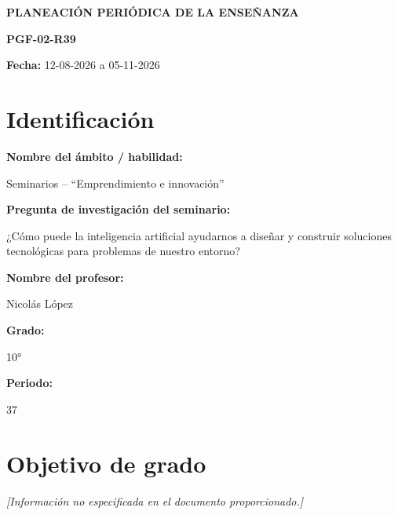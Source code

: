\documentclass[12pt,a4paper]{article}
\newcommand{\placeholder}[1]{
	\textit{\textcolor{secondary}{[#1]}}
}
\begin{document}
	
	
	\begin{center}
		
		{\Large\bfseries\color{primary}
			PLANEACIÓN PERIÓDICA DE LA ENSEÑANZA}
		
		\vspace{0.4cm}
		
		{\normalsize\bfseries PGF-02-R39}
		
		\vspace{0.3cm}
		
		{\normalsize
			\textbf{Fecha:} 12-08-2026 a 05-11-2026}
		
	\end{center}
	
	\vspace{0.8cm}
	
	
	\section{Identificación}
	
	\textbf{Nombre del ámbito / habilidad:}
	
	Seminarios -- ``Emprendimiento e innovación''
	
	\textbf{Pregunta de investigación del seminario:}
	
	¿Cómo puede la inteligencia artificial ayudarnos a diseñar y construir soluciones tecnológicas para problemas de nuestro entorno?
	
	\textbf{Nombre del profesor:}
	
	Nicolás López
	
	\textbf{Grado:}
	
	10°
	
	\textbf{Periodo:}
	
	37
	
	
	\section{Objetivo de grado}
	
	\placeholder{Información no especificada en el documento proporcionado.}
	
\end{document}
